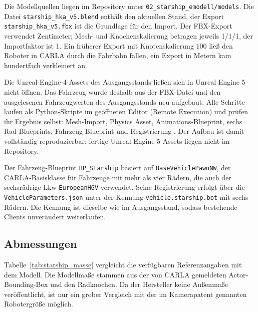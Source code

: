 Die Modellquellen liegen im Repository unter \texttt{02\_starship\_emodell/models}. Die
Datei \texttt{starship\_hka\_v5.blend} enthält den aktuellen Stand, der Export
\texttt{starship\_hka\_v5.fbx} ist die Grundlage für den Import. Der FBX-Export verwendet
Zentimeter; Mesh- und Knochenskalierung betragen jeweils 1/1/1, der Importfaktor ist 1.
Ein früherer Export mit Knotenskalierung 100 ließ den Roboter in CARLA durch die Fahrbahn
fallen, ein Export in Metern kam hundertfach verkleinert an.

Die Unreal-Engine-4-Assets des Ausgangsstands ließen sich in Unreal Engine 5 nicht
öffnen. Das Fahrzeug wurde deshalb aus der FBX-Datei und den ausgelesenen Fahrzeugwerten
des Ausgangsstands neu aufgebaut. Alle Schritte laufen als Python-Skripte im geöffneten
Editor (Remote Execution) und prüfen ihr Ergebnis selbst: Mesh-Import, Physics Asset,
Animations-Blueprint, sechs Rad-Blueprints, Fahrzeug-Blueprint und Registrierung
\parencite{rauch_lee_repo}. Der Aufbau ist damit vollständig reproduzierbar; fertige
Unreal-Engine-5-Assets liegen nicht im Repository.

Der Fahrzeug-Blueprint \texttt{BP\_Starship} basiert auf \texttt{BaseVehiclePawnNW},
der CARLA-Basisklasse für Fahrzeuge mit mehr als vier Rädern, die auch der
sechsrädrige Lkw \texttt{EuropeanHGV} verwendet. Seine Registrierung erfolgt über die
\texttt{VehicleParameters.json} unter der Kennung \texttt{vehicle.starship.bot} mit sechs
Rädern. Die Kennung ist dieselbe wie im Ausgangsstand, sodass bestehende Clients
unverändert weiterlaufen.

\subsection{Abmessungen}
\label{sec:starship_masse}

Tabelle~\ref{tab:starship_masse} vergleicht die verfügbaren Referenzangaben mit dem
Modell. Die Modellmaße stammen aus der von CARLA gemeldeten Actor-Bounding-Box und den
Radknochen. Da der Hersteller keine Außenmaße veröffentlicht, ist nur ein grober
Vergleich mit der im Kamerapatent genannten Robotergröße möglich.

